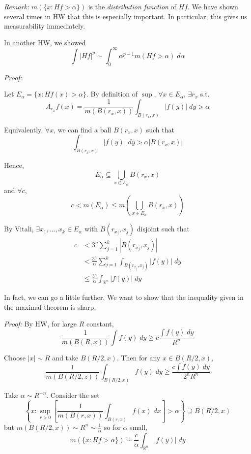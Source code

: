 \documentclass[12pt]{report}
\newcommand{\R}{\mathbb{R}}
\newcommand{\abs}[1]{\left\vert #1 \right\vert}
\renewcommand{\L}{\text{L}}
\newcommand{\sub}{\subseteq}
\newenvironment*{tbox}[2][gray]{
    \begin{tcolorbox}[
        parbox=false,
        colback=#1!5!white,
        colframe=#1!75!black,
        breakable,
        title={#2}
    ]}
    {\end{tcolorbox}}
\newenvironment*{proof}[1][blue]{
\begin{tcolorbox}[
    parbox=false,
    colback=#1!5!white,
    colframe=#1!75!black,
    breakable
]}
{\end{tcolorbox}}
\begin{document}
        \begin{tbox}{\textbf{Maximal Theorem:} $\exists c(n) > 0$ such that for $f \in \L^1$, 
            \[m(\{x: H f > \alpha\}) \leq \frac{C}{\alpha} \int_{\R^n} \abs{f(y)}\; dy\]}

            \emph{Remark:} $m(\{x: H f > \alpha\})$ is the \emph{distribution function} of $H f$. We have shown several times in HW that this is especially important. In particular, this gives us measurability immediately.

            In another HW, we showed 
            \[\int \abs{H f}^p \sim \int_0^{\infty} \alpha^{p-1} m(H f > \alpha)\; d\alpha\]

            \emph{Proof:} 

            Let $E_{\alpha} = \{x: H f(x) > \alpha\}$. By definition of $\sup$, $\forall x \in E_{\alpha}$, $\exists r_x$ s.t. 
            \[A_{r_x} f(x) = \frac{1}{m(B(r_x, x))} \int_{B(r_x, x)} \abs{f(y)} \; dy > \alpha\]

            Equivalently, $\forall x$, we can find a ball $B(r_x, x)$ such that
            \[\int_{B(r_x, x)} \abs{f(y)}\; dy > \alpha \abs{B(r_x, x)}\]

            Hence,
            \[E_{\alpha} \sub \bigcup_{x \in E_{\alpha}} B(r_x, x)\]
            and $\forall c$, 
            \[c < m(E_{\alpha}) \leq m\left(\bigcup_{x \in E_{\alpha}} B(r_x, x)\right)\]

            By Vitali, $\exists x_1, \dots, x_k \in E_{\alpha}$ with $B(r_{x_j}, x_j)$ disjoint such that 
            \begin{align*}
                c &< 3^n \sum_{j=1}^k \abs{B(r_{x_j}, x_j)}\\ 
                    &<  \frac{3^n}{\alpha} \sum_{j=1}^k \int_{B(r_{x_j}, x_j)} \abs{f(y)}\; dy\\
                    &\leq \frac{3^n}{\alpha} \int_{\R^n} \abs{f(y)}\; dy
            \end{align*}
        \end{tbox}

        In fact, we can go a little further. We want to show that the inequality given in the maximal theorem is sharp. 

        \begin{proof}
            \emph{Proof:} By HW, for large $R$ constant,
            \[\frac{1}{m(B(R, x))} \int f(y)\; dy \geq c \frac{\int f(y)\; dy}{R^n}\]

            Choose $\abs{x} \sim R$ and take $B(R/2, x)$. Then for any $x \in B(R/2, x)$,
            \[\frac{1}{m(B(R/2, z))} \int_{B(R/2, x)} f(y)\;dy \geq \frac{c\int f(y)\;dy}{2^n R^n}\]

            Take $\alpha \sim R^{-n}$. Consider the set 
            \[\left\{x: \sup_{r > 0} \left[\frac{1}{m(B(r, x))} \int_{B(r, x)} f(x) \; dx\right] > \alpha\right\} \supseteq B(R/2, x)\]
            but $m(B(R/2, x)) \sim R^n \sim \frac{1}{\alpha}$ so for $\alpha$ small, 
            \[m(\{x: H f > \alpha\}) \sim \frac{c}{\alpha} \int_{\R^n} \abs{f(y)}\; dy\]
        \end{proof}
\end{document}
